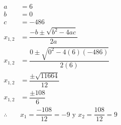 {\begin{solutionbox}{11cm}
\begin{multicols}{2}
\[\begin{array}{rl}
                    a          & =6                                                          \\
                    b          & =0                                                          \\
                    c          & =-486                                                       \\
                    x_{1,2}    & = \dfrac{-b\pm\sqrt{b^2-4ac}}{2a}                           \\[2em]
                    x_{1,2}    & = \dfrac{0\pm\sqrt{0^2-4(6)(-486)}}{2(6)}                   \\[2em]
                    x_{1,2}    & = \dfrac{\pm\sqrt{11664}}{12}                               \\[2em]
                    x_{1,2}    & = \dfrac{\pm108}{6}                                         \\[2em]
                    \therefore & x_1 =\dfrac{-108}{12}=-9 \text{ y }  x_2 =\dfrac{108}{12}=9 \\[2em]
                \end{array}
            \]
        \end{multicols}
    \end{solutionbox}
}